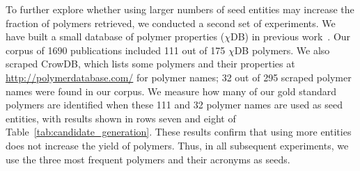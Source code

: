 To further explore whether using larger numbers of seed entities may increase the fraction of polymers retrieved,
we conducted a second set of experiments.
We have built a small database of polymer properties ($\chi$DB) in previous work~\cite{tchoua2016hybrid,tchoua2016hybridi}. 
Our corpus of \num{1690} publications included 111 out of 175 $\chi$DB polymers.  
We also scraped CrowDB, which lists some polymers and their properties at \url{http://polymerdatabase.com/} for polymer names; 32 out of 295 scraped polymer names were found in our corpus.
We measure how many of our gold standard polymers are identified when
these 111 and 32 polymer names are used as seed entities, 
with results shown in rows seven and eight of Table~\ref{tab:candidate_generation}.
These results confirm that using more entities does not increase the yield of polymers.
Thus, in all subsequent experiments, we use the three most frequent polymers and their acronyms as seeds. 


